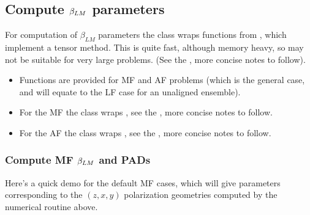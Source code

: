 \documentclass[letterpaper,10pt,english]{jupyterBook}
\begin{document}
\subsection{Compute \protect\(\beta_{LM}\protect\) parameters}
\label{\detokenize{testChpt/ePSproc_class_demo_161020:compute-beta-lm-parameters}}
\sphinxAtStartPar
For computation of \(\beta_{LM}\) parameters the class wraps functions from , which implement a tensor method. This is quite fast, although memory heavy, so may not be suitable for very large problems. (See the , more concise notes to follow).
\begin{itemize}
\item {} 
\sphinxAtStartPar
Functions are provided for MF and AF problems (which is the general case, and will equate to the LF case for an unaligned ensemble).

\item {} 
\sphinxAtStartPar
For the MF the class wraps , see the , more concise notes to follow.

\item {} 
\sphinxAtStartPar
For the AF the class wraps , see the , more concise notes to follow.

\end{itemize}


\subsubsection{Compute MF \protect\(\beta_{LM}\protect\) and PADs}
\label{\detokenize{testChpt/ePSproc_class_demo_161020:compute-mf-beta-lm-and-pads}}
\sphinxAtStartPar
Here’s a quick demo for the default MF cases, which will give parameters corresponding to the \((z,x,y)\) polarization geometries computed by the numerical routine above.
\end{document}
